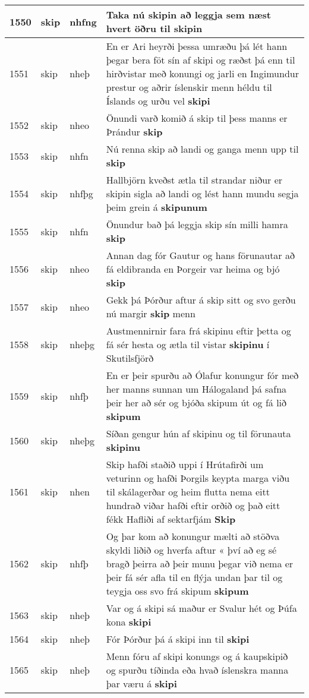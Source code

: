 \documentclass{article}
\begin{document}
\begin{longtable}{p{1cm}|p{1cm}|p{1cm}|p{13cm}}
\hline
1550&skip&nhfng&Taka nú skipin að leggja sem næst hvert öðru til \textbf{skipin} \\
\hline
1551&skip&nheþ&En er Ari heyrði þessa umræðu þá lét hann þegar bera föt sín af skipi og ræðst þá enn til hirðvistar með konungi og jarli en Ingimundur prestur og aðrir íslenskir menn héldu til Íslands og urðu vel \textbf{skipi} \\
\hline
1552&skip&nheo&Önundi varð komið á skip til þess manns er Þrándur \textbf{skip} \\
\hline
1553&skip&nhfn&Nú renna skip að landi og ganga menn upp til \textbf{skip} \\
\hline
1554&skip&nhfþg&Hallbjörn kveðst ætla til strandar niður er skipin sigla að landi og lést hann mundu segja þeim grein á \textbf{skipunum} \\
\hline
1555&skip&nhfn&Önundur bað þá leggja skip sín milli hamra \textbf{skip} \\
\hline
1556&skip&nheo&Annan dag fór Gautur og hans förunautar að fá eldibranda en Þorgeir var heima og bjó \textbf{skip} \\
\hline
1557&skip&nheo&Gekk þá Þórður aftur á skip sitt og svo gerðu nú margir \textbf{skip} menn\\
\hline
1558&skip&nheþg&Austmennirnir fara frá skipinu eftir þetta og fá sér hesta og ætla til vistar \textbf{skipinu} í Skutilsfjörð\\
\hline
1559&skip&nhfþ&En er þeir spurðu að Ólafur konungur fór með her manns sunnan um Hálogaland þá safna þeir her að sér og bjóða skipum út og fá lið \textbf{skipum} \\
\hline
1560&skip&nheþg&Síðan gengur hún af skipinu og til förunauta \textbf{skipinu} \\
\hline
1561&skip&nhen&Skip hafði staðið uppi í Hrútafirði um veturinn og hafði Þorgils keypta marga viðu til skálagerðar og heim flutta nema eitt hundrað viðar hafði eftir orðið og það eitt fékk Hafliði af sektarfjám \textbf{Skip} \\
\hline
1562&skip&nhfþ&Og þar kom að konungur mælti að stöðva skyldi liðið og hverfa aftur « því að eg sé bragð þeirra að þeir munu þegar við nema er þeir fá sér afla til en flýja undan þar til og teygja oss svo frá skipum \textbf{skipum} \\
\hline
1563&skip&nheþ&Var og á skipi sá maður er Svalur hét og Þúfa kona \textbf{skipi} \\
\hline
1564&skip&nheþ&Fór Þórður þá á skipi inn til \textbf{skipi} \\
\hline
1565&skip&nheþ&Menn fóru af skipi konungs og á kaupskipið og spurðu tíðinda eða hvað íslenskra manna þar væru á \textbf{skipi} \\

\end{longtable}
\end{document}

